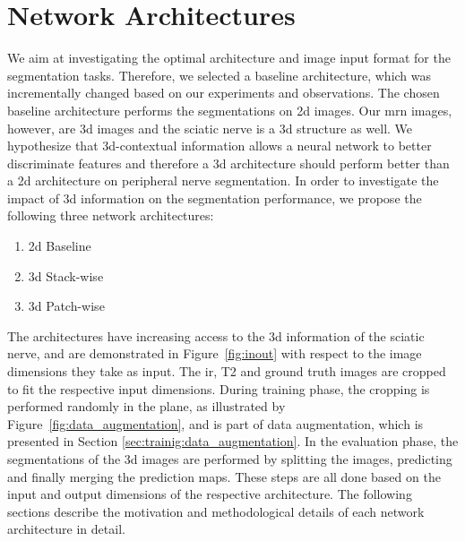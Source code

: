 \section{Network Architectures} \label{sec:architecture}
We aim at investigating the optimal architecture and image input format for the segmentation tasks. Therefore, we selected a baseline architecture, which was incrementally changed based on our experiments and observations. The chosen baseline architecture performs the segmentations on \gls{2d} images. Our \gls{mrn} images, however, are \gls{3d} images and the sciatic nerve is a \gls{3d} structure as well. We hypothesize that \gls{3d}-contextual information allows a neural network to better discriminate features and therefore a \gls{3d} architecture should perform better than a \gls{2d} architecture on peripheral nerve segmentation. In order to investigate the impact of \gls{3d} information on the segmentation performance, we propose the following three network architectures:
\begin{enumerate}
  \item \gls{2d} Baseline
  \item \gls{3d} Stack-wise
  \item \gls{3d} Patch-wise
\end{enumerate}
The architectures have increasing access to the \gls{3d} information of the sciatic nerve, and are demonstrated in Figure~\ref{fig:inout} with respect to the image dimensions they take as input. The \gls{ir}, T2 and ground truth images are cropped to fit the respective input dimensions. During training phase, the cropping is performed randomly in the plane, as illustrated by Figure~\ref{fig:data_augmentation}, and is part of data augmentation, which is presented in Section \ref{sec:trainig:data_augmentation}. In the evaluation phase, the segmentations of the \gls{3d} images are performed by splitting the images, predicting and finally merging the prediction maps. These steps are all done based on the input and output dimensions of the respective architecture. The following sections describe the motivation and methodological details of each network architecture in detail.

